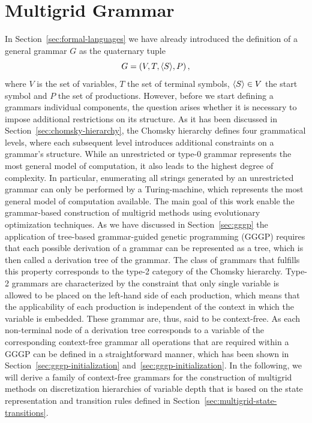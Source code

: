 \section{Multigrid Grammar}
\label{sec:multigrid-grammar}
\setcounter{equation}{0}
In Section~\ref{sec:formal-languages} we have already introduced the definition of a general grammar $G$ as the quaternary tuple 
\begin{equation*}
	G = \left(V, T, \langle S \rangle, P \right),
\end{equation*}
where $V$ is the set of variables, $T$ the set of terminal symbols, $\langle S \rangle \in V$ the start symbol and $P$ the set of productions.
However, before we start defining a grammars individual components, the question arises whether it is necessary to impose additional restrictions on its structure.
As it has been discussed in Section~\ref{sec:chomsky-hierarchy}, the Chomsky hierarchy defines four grammatical levels, where each subsequent level introduces additional constraints on a grammar's structure.
While an unrestricted or type-0 grammar represents the most general model of computation, it also leads to the highest degree of complexity.
In particular, enumerating all strings generated by an unrestricted grammar can only be performed by a Turing-machine, which represents the most general model of computation available.
The main goal of this work enable the grammar-based construction of multigrid methods using evolutionary optimization techniques.
As we have discussed in Section~\ref{sec:gggp} the application of tree-based grammar-guided genetic programming (GGGP) requires that each possible derivation of a grammar can be represented as a tree, which is then called a derivation tree of the grammar.
The class of grammars that fulfills this property corresponds to the type-2 category of the Chomsky hierarchy.
Type-2 grammars are characterized by the constraint that only single variable is allowed to be placed on the left-hand side of each production, which means that the applicability of each production is independent of the context in which the variable is embedded. 
These grammar are, thus, said to be context-free.
As each non-terminal node of a derivation tree corresponds to a variable of the corresponding context-free grammar all operations that are required within a GGGP can be defined in a straightforward manner, which has been shown in Section~\ref{sec:gggp-initialization} and~\ref{sec:gggp-initialization}.
In the following, we will derive a family of context-free grammars for the construction of multigrid methods on discretization hierarchies of variable depth that is based on the state representation and transition rules defined in Section~\ref{sec:multigrid-state-transitions}.
